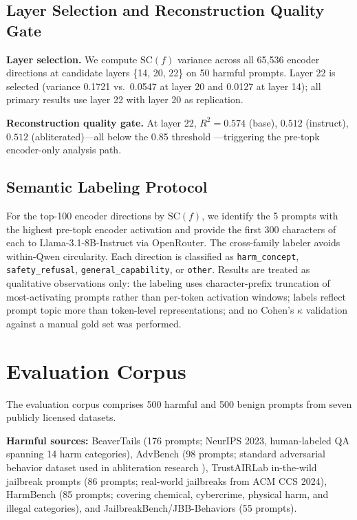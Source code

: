 \documentclass[11pt,letterpaper]{article}
\begin{document}
\subsection{Layer Selection and Reconstruction Quality Gate}
\label{sec:recon}

\textbf{Layer selection.} We compute $\text{SC}(f)$ variance across all 65,536 encoder directions at
candidate layers \{14, 20, 22\} on 50 harmful prompts. Layer 22 is selected (variance 0.1721 vs.\
0.0547 at layer 20 and 0.0127 at layer 14); all primary results use layer 22 with layer 20 as
replication.

\textbf{Reconstruction quality gate.} At layer 22, $R^2 = 0.574$ (base), $0.512$ (instruct),
$0.512$ (abliterated)---all below the 0.85 threshold \citep{Li2025}---triggering the pre-topk
encoder-only analysis path.

\subsection{Semantic Labeling Protocol}
\label{sec:labeling}

For the top-100 encoder directions by $\text{SC}(f)$, we identify the 5 prompts with the highest
pre-topk encoder activation and provide the first 300 characters of each to Llama-3.1-8B-Instruct
via OpenRouter. The cross-family labeler avoids within-Qwen circularity. Each direction is classified
as \texttt{harm\_concept}, \texttt{safety\_refusal}, \texttt{general\_capability}, or \texttt{other}.
Results are treated as qualitative observations only: the labeling uses character-prefix truncation of
most-activating prompts rather than per-token activation windows; labels reflect prompt topic more
than token-level representations; and no Cohen's $\kappa$ validation against a manual gold set was
performed.

\section{Evaluation Corpus}
\label{sec:corpus}

The evaluation corpus comprises 500 harmful and 500 benign prompts from seven publicly licensed
datasets.

\noindent\textbf{Harmful sources:} BeaverTails \citep{Ji2023} (176 prompts; NeurIPS 2023,
human-labeled QA spanning 14 harm categories), AdvBench (98 prompts; standard adversarial behavior
dataset used in abliteration research \citep{Arditi2024}), TrustAIRLab in-the-wild jailbreak prompts
(86 prompts; real-world jailbreaks from ACM CCS 2024), HarmBench \citep{Mazeika2024} (85 prompts;
covering chemical, cybercrime, physical harm, and illegal categories), and
JailbreakBench/JBB-Behaviors \citep{Chao2024} (55 prompts).
\end{document}
